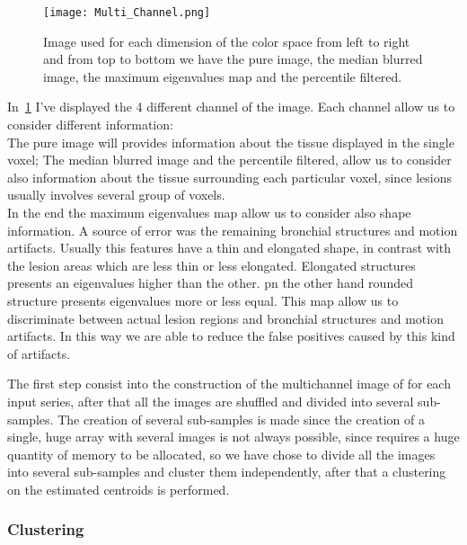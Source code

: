 		\begin{figure}[h]
			\centering
				\texttt{[image: Multi\_Channel.png]}
			\label{fig:MultiChannel}\caption{Image used for each dimension of the color space from left to right and from top to bottom we have the pure image, the median blurred image, the maximum eigenvalues map  and the percentile filtered.}
		\end{figure}
	
		In \figurename\,\ref{fig:MultiChannel} I've displayed the 4 different channel of the image. Each channel allow us to consider different information:\\ 
		The pure image will provides information about the tissue displayed in the single voxel; 
		The median blurred image and the percentile filtered, allow us to consider also information about the tissue surrounding each particular voxel, since lesions usually involves several group of voxels.\\
		In the end the maximum eigenvalues map allow us to consider also shape information. A source of error was the remaining bronchial structures and  motion artifacts. Usually this features have a thin and elongated shape, in contrast with the lesion areas which are less thin or less elongated. Elongated structures presents an eigenvalues higher than the other. pn the other hand rounded structure presents eigenvalues more or less equal. This map allow us to discriminate between actual lesion regions and bronchial structures and motion artifacts.  In this way we are able to reduce the false positives caused by this kind of artifacts.
		
		The first step consist into the construction of the multichannel image of for each input series, after that all the images are shuffled and divided into several sub-samples. The creation of several sub-samples is made since the creation of a single, huge array with several images is not always possible, since requires a huge quantity of memory to be allocated, so we have chose to divide all the images into several sub-samples and cluster them independently, after that a clustering on the estimated centroids is performed.\\

		
		\subsubsection*{Clustering} 
		
